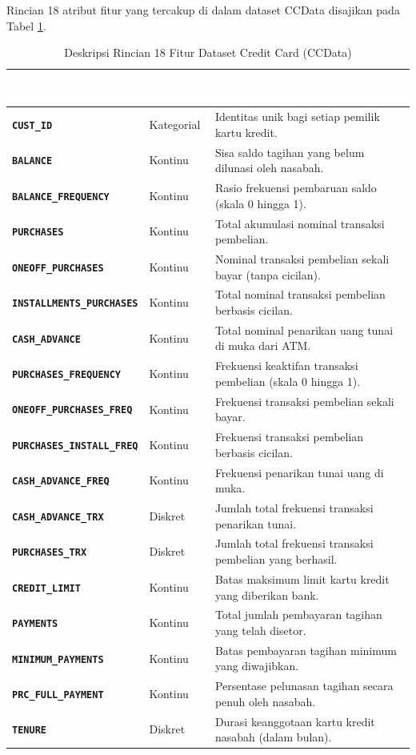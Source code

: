\documentclass[a4paper,oneside,12pt]{report}
\newcommand{\thead}[1]{\textcolor{white}{\textbf{#1}}}
\begin{document}
Rincian 18 atribut fitur yang tercakup di dalam dataset CCData disajikan pada Tabel \ref{tab:cc-features}.

\begin{table}[H]
\centering
\caption{Deskripsi Rincian 18 Fitur Dataset Credit Card (CCData)}
\label{tab:cc-features}
\renewcommand{\arraystretch}{1.25}
\small
\begin{tabularx}{\textwidth}{>{\bfseries}l l X}
\toprule
\rowcolor{tableheader}
\thead{Nama Fitur} & \thead{Tipe Data} & \thead{Deskripsi dan Makna Bisnis} \\
\midrule
\texttt{CUST\_ID} & Kategorial & Identitas unik bagi setiap pemilik kartu kredit. \\
\texttt{BALANCE} & Kontinu & Sisa saldo tagihan yang belum dilunasi oleh nasabah. \\
\texttt{BALANCE\_FREQUENCY} & Kontinu & Rasio frekuensi pembaruan saldo (skala 0 hingga 1). \\
\texttt{PURCHASES} & Kontinu & Total akumulasi nominal transaksi pembelian. \\
\texttt{ONEOFF\_PURCHASES} & Kontinu & Nominal transaksi pembelian sekali bayar (tanpa cicilan). \\
\texttt{INSTALLMENTS\_PURCHASES} & Kontinu & Total nominal transaksi pembelian berbasis cicilan. \\
\texttt{CASH\_ADVANCE} & Kontinu & Total nominal penarikan uang tunai di muka dari ATM. \\
\texttt{PURCHASES\_FREQUENCY} & Kontinu & Frekuensi keaktifan transaksi pembelian (skala 0 hingga 1). \\
\texttt{ONEOFF\_PURCHASES\_FREQ} & Kontinu & Frekuensi transaksi pembelian sekali bayar. \\
\texttt{PURCHASES\_INSTALL\_FREQ} & Kontinu & Frekuensi transaksi pembelian berbasis cicilan. \\
\texttt{CASH\_ADVANCE\_FREQ} & Kontinu & Frekuensi penarikan tunai uang di muka. \\
\texttt{CASH\_ADVANCE\_TRX} & Diskret & Jumlah total frekuensi transaksi penarikan tunai. \\
\texttt{PURCHASES\_TRX} & Diskret & Jumlah total frekuensi transaksi pembelian yang berhasil. \\
\texttt{CREDIT\_LIMIT} & Kontinu & Batas maksimum limit kartu kredit yang diberikan bank. \\
\texttt{PAYMENTS} & Kontinu & Total jumlah pembayaran tagihan yang telah disetor. \\
\texttt{MINIMUM\_PAYMENTS} & Kontinu & Batas pembayaran tagihan minimum yang diwajibkan. \\
\texttt{PRC\_FULL\_PAYMENT} & Kontinu & Persentase pelunasan tagihan secara penuh oleh nasabah. \\
\texttt{TENURE} & Diskret & Durasi keanggotaan kartu kredit nasabah (dalam bulan). \\
\bottomrule
\end{tabularx}
\end{table}
\end{document}
